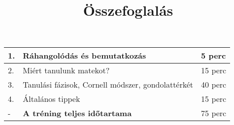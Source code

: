 \documentclass[../Main.tex]{subfiles}
\begin{document}
\title{Összefoglalás}

\begin{center}
    \begin{tabular}{| m{1.3 em} | m{} | m{} |}
    \hline
    1. & Ráhangolódás és bemutatkozás & 5 perc \\
    \hline
    2. & Miért tanulunk matekot? & 15 perc \\
    \hline
    3. & Tanulási fázisok, Cornell módszer, gondolattérkét & 40 perc \\
    \hline
    4. & Általános tippek & 15 perc \\
    \hline
    - & \textbf{A tréning teljes időtartama} & 75 perc \\
    \hline
    \end{tabular}
\end{center}
\end{document}
